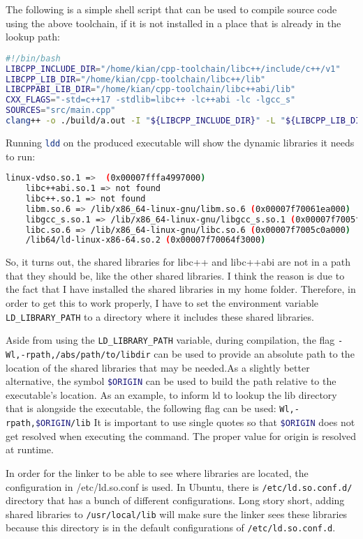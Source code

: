 The following is a simple shell script that can be used to compile source code using the above toolchain, if it is not installed in a place that is already in the lookup path:

\begin{lstlisting}[language=bash]
#!/bin/bash
LIBCPP_INCLUDE_DIR="/home/kian/cpp-toolchain/libc++/include/c++/v1"
LIBCPP_LIB_DIR="/home/kian/cpp-toolchain/libc++/lib"
LIBCPPABI_LIB_DIR="/home/kian/cpp-toolchain/libc++abi/lib"
CXX_FLAGS="-std=c++17 -stdlib=libc++ -lc++abi -lc -lgcc_s"
SOURCES="src/main.cpp"
clang++ -o ./build/a.out -I "${LIBCPP_INCLUDE_DIR}" -L "${LIBCPP_LIB_DIR}" -L "${LIBCPPABI_LIB_DIR}" ${CXX_FLAGS} ${SOURCES}
\end{lstlisting}

Running \lstinline[language=bash]|ldd| on the produced executable will show the dynamic libraries it needs to run:

\begin{lstlisting}[language=bash]
    linux-vdso.so.1 =>  (0x00007fffa4997000)
    libc++abi.so.1 => not found
    libc++.so.1 => not found
    libm.so.6 => /lib/x86_64-linux-gnu/libm.so.6 (0x00007f70061ea000)
    libgcc_s.so.1 => /lib/x86_64-linux-gnu/libgcc_s.so.1 (0x00007f7005fd4000)
    libc.so.6 => /lib/x86_64-linux-gnu/libc.so.6 (0x00007f7005c0a000)
    /lib64/ld-linux-x86-64.so.2 (0x00007f70064f3000)
\end{lstlisting}

So, it turns out, the shared libraries for libc++ and libc++abi are not in a path that they should be, like the other shared libraries. I think the reason is due to the fact that I have installed the shared libraries in my home folder. Therefore, in order to get this to work properly, I have to set the environment variable \lstinline[language=bash]|LD_LIBRARY_PATH| to a directory where it includes these shared libraries.

Aside from using the \lstinline[language=bash]|LD_LIBRARY_PATH| variable, during compilation, the flag \lstinline[language=bash]|-Wl,-rpath,/abs/path/to/libdir| can be used to provide an absolute path to the location of the shared libraries that may be needed.As a slightly better alternative, the symbol \lstinline[language=bash]|$ORIGIN| can be used to build the path relative to the executable's location. As an example, to inform ld to lookup the lib directory that is alongside the executable, the following flag can be used: \lstinline[language=bash]|Wl,-rpath,$ORIGIN/lib|
It is important to use single quotes so that \lstinline[language=bash]|$ORIGIN| does not get resolved when executing the command. The proper value for origin is resolved at runtime.

In order for the linker to be able to see where libraries are located, the configuration in /etc/ld.so.conf is used. In Ubuntu, there is \lstinline[language=bash]|/etc/ld.so.conf.d/| directory that has a bunch of different configurations. Long story short, adding shared libraries to \lstinline[language=bash]|/usr/local/lib| will make sure the linker sees these libraries because this directory is in the default configurations of \lstinline[language=bash]|/etc/ld.so.conf.d|.
